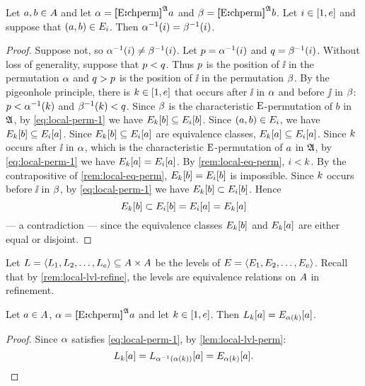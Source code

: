 \begin{remark}\label{rem:local-inv-perm}
Let $a, b \in A$ and let
$\alpha = {\bm{[}\mathrm{E}\mathord{\bm{:}}\mathrm{chperm}\bm{]}}^{\mathfrak{A}}a$ and $\beta = {\bm{[}\mathrm{E}\mathord{\bm{:}}\mathrm{chperm}\bm{]}}^{\mathfrak{A}}b$.
Let $i \in [1,e]$ and suppose that $(a, b) \in E_{i}$.
Then $\alpha^{-1}(i) = \beta^{-1}(i)$.
\end{remark}
\begin{proof}
Suppose not, so $\alpha^{-1}(i) \neq \beta^{-1}(i)$.
Let $p = \alpha^{-1}(i)$ and $q = \beta^{-1}(i)$.
Without loss of generality, suppose that $p < q$.
Thus $p$ is the position of $\ii$ in the permutation $\alpha$ and 
$q > p$ is the position of $\ii$ in the permutation $\beta$. 
By the pigeonhole principle, there is $k \in [1,e]$ that occurs after $\ii$
in $\alpha$ and before $\jj$ in $\beta$:
$p < \alpha^{-1}(k)$ and $\beta^{-1}(k) < q$.
Since $\beta$ is the characteristic $\mathrm{E}$-permutation of $b$ in $\mathfrak{A}$, by
\cref{eq:local-perm-1} we have $E_{k}[b] \subseteq E_{i}[b]$.
Since $(a, b) \in E_{i}$, we have $E_{k}[b] \subseteq
E_{i}[a]$.
Since $E_{k}[b] \subseteq E_{i}[a]$ are equivalence classes,
$E_{k}[a] \subseteq E_{i}[a]$.
Since $k$ occurs after $\ii$ in $\alpha$, which is the characteristic
$\mathrm{E}$-permutation of $a$ in $\mathfrak{A}$, 
by \cref{eq:local-perm-1} we have $E_{k}[a] = E_{i}[a]$.
By \cref{rem:local-eq-perm}, $i < k$.
By the contrapositive of \cref{rem:local-eq-perm},
$E_{k}[b] = E_{i}[b]$ is impossible.
Since $k$ occurs before $\ii$ in $\beta$, 
by \cref{eq:local-perm-1} we have $E_{k}[b] \subset E_{i}[b]$.
Hence
\[
  E_{k}[b] \subset E_{i}[b] = E_{i}[a] = E_{k}[a]
\]
--- a contradiction --- since the equivalence classes $E_{k}[b]$ and
$E_{k}[a]$ are either equal or disjoint.
\end{proof}

Let
$L = \left\langle L_{1},L_{2},\dots,L_{e} \right\rangle \subseteq {A\times A}$ be
the levels of $E = \left\langle E_{1}, E_{2}, \dots, E_{e} \right\rangle$.
Recall that by \cref{rem:local-lvl-refine}, the levels are equivalence relations
on $A$ in refinement.

\begin{remark}\label{rem:local-lvl-perm}
Let $a \in A$, $\alpha = {\bm{[}\mathrm{E}\mathord{\bm{:}}\mathrm{chperm}\bm{]}}^{\mathfrak{A}}a$ and let $k \in [1,e]$.
Then $L_{k}[a] = E_{\alpha(k)}[a]$.
\end{remark}
\begin{proof}
Since $\alpha$ satisfies \cref{eq:local-perm-1}, by \cref{lem:local-lvl-perm}:
\[
  L_{k}[a] = 
  L_{\alpha^{-1}(\alpha(k))}[a] =
  E_{\alpha(k)}[a].
\]
\end{proof}

